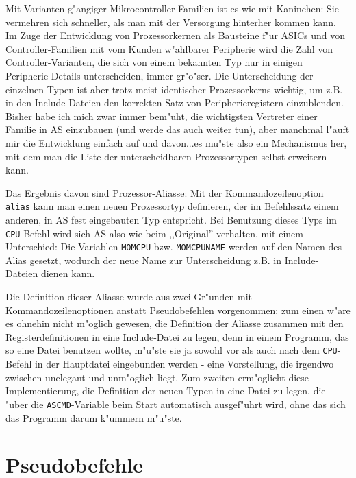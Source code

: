 \documentclass[12pt,a4paper,twoside]{report}
\newcommand{\tty}[1]{{\tt #1}}
\begin{document}
Mit Varianten g"angiger Mikrocontroller-Familien ist es wie mit
Kaninchen: Sie vermehren sich schneller, als man mit der Versorgung
hinterher kommen kann.  Im Zuge der Entwicklung von Prozessorkernen als
Bausteine f"ur ASICs und von Controller-Familien mit vom Kunden w"ahlbarer
Peripherie wird die Zahl von Controller-Varianten, die sich von einem
bekannten Typ nur in einigen Peripherie-Details unterscheiden, immer
gr"o"ser.  Die Unterscheidung der einzelnen Typen ist aber trotz meist
identischer Prozessorkerns wichtig, um z.B. in den Include-Dateien den
korrekten Satz von Peripherieregistern einzublenden.  Bisher habe ich
mich zwar immer bem"uht, die wichtigsten Vertreter einer Familie in AS
einzubauen (und werde das auch weiter tun), aber manchmal l"auft mir
die Entwicklung einfach auf und davon...es mu"ste also ein Mechanismus
her, mit dem man die Liste der unterscheidbaren Prozessortypen selbst
erweitern kann.
\par
Das Ergebnis davon sind Prozessor-Aliasse: Mit der Kommandozeilenoption \tty{alias}
kann man einen neuen Prozessortyp definieren, der im Befehlssatz einem
anderen, in AS fest eingebauten Typ entspricht.  Bei Benutzung dieses
Typs im \tty{CPU}-Befehl wird sich AS also wie beim ,,Original'' verhalten,
mit einem Unterschied: Die Variablen \tty{MOMCPU} bzw. \tty{MOMCPUNAME}
werden auf den Namen des Alias gesetzt, wodurch der neue Name zur
Unterscheidung z.B. in Include-Dateien dienen kann.
\par
Die Definition dieser Aliasse wurde aus zwei Gr"unden mit
Kommandozeilenoptionen anstatt Pseudobefehlen vorgenommen: zum einen
w"are es ohnehin nicht m"oglich gewesen, die Definition der Aliasse
zusammen mit den Registerdefinitionen in eine Include-Datei zu legen, denn
in einem Programm, das so eine Datei benutzen wollte, m"u"ste sie ja sowohl
vor als auch nach dem \tty{CPU}-Befehl in der Hauptdatei eingebunden
werden - eine Vorstellung, die irgendwo zwischen unelegant und unm"oglich
liegt.  Zum zweiten erm"oglicht diese Implementierung, die Definition der
neuen Typen in eine Datei zu legen, die "uber die \tty{ASCMD}-Variable beim
Start automatisch ausgef"uhrt wird, ohne das sich das Programm darum
k"ummern m"u"ste.


\cleardoublepage
\chapter{Pseudobefehle}
\end{document}

